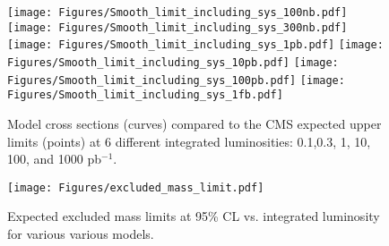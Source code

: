 \begin{figure}[!ht]
  \begin{center}
     \texttt{[image: Figures/Smooth\_limit\_including\_sys\_100nb.pdf]}
     \texttt{[image: Figures/Smooth\_limit\_including\_sys\_300nb.pdf]}
     \texttt{[image: Figures/Smooth\_limit\_including\_sys\_1pb.pdf]}
     \texttt{[image: Figures/Smooth\_limit\_including\_sys\_10pb.pdf]}
     \texttt{[image: Figures/Smooth\_limit\_including\_sys\_100pb.pdf]}
     \texttt{[image: Figures/Smooth\_limit\_including\_sys\_1fb.pdf]}
    \caption{Model cross sections (curves) compared to the CMS expected upper 
    limits (points) at 6 different integrated luminosities:
    0.1,0.3, 1, 10, 100, and 1000 pb$^{-1}$.}
    \label{future_limit}
  \end{center}
\end{figure}

\begin{figure}[!ht]
  \begin{center}
     \texttt{[image: Figures/excluded\_mass\_limit.pdf]}
    \caption{Expected excluded mass limits at 95\% CL vs. integrated luminosity for
    various various models.}
    \label{future_mass_limit}
  \end{center}
\end{figure}
